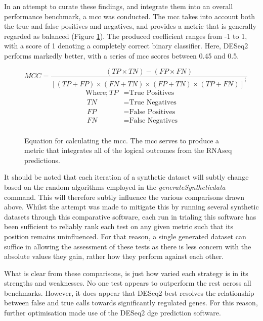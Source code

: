 In an attempt to curate these findings, and integrate them into an overall performance benchmark, a \acrshort{mcc} was conducted. The \acrshort{mcc} takes into account both the true and false positives and negatives, and provides a metric that is generally regarded as balanced (Figure \ref{mcc_calc}). The produced coefficient ranges from -1 to 1, with a score of 1 denoting a completely correct binary classifier. Here, DESeq2 performs markedly better, with a series of \acrshort{mcc} scores between 0.45 and 0.5.

\begin{figure}
\[MCC = \frac{\left ( TP \times TN \right) - \left ( FP \times FN \right )}{\left [ \left ( TP + FP \right ) \times \left ( FN + TN \right ) \times\left ( FP + TN \right ) \times \left ( TP + FN \right )\right ]^{^{\frac{1}{2}}}}\]
\normalsize
\begin{align*}
\text{Where;} ~TP &= \text{True Positives} \\
~TN &= \text{True Negatives} \\
~FP &= \text{False Positives} \\
~FN &= \text{False Negatives} \\
\end{align*}
\caption{Equation for calculating the \acrfull{mcc}. The \acrshort{mcc} serves to produce a metric that integrates all of the logical outcomes from the RNAseq predictions.}
\label{mcc_calc}
\end{figure}

It should be noted that each iteration of a synthetic dataset will subtly change based on the random algorithms employed in the \textit{generateSyntheticdata} command. This will therefore subtly influence the various comparisons drawn above. Whilst the attempt was made to mitigate this by running several synthetic datasets through this comparative software, each run in trialing this software has been sufficient to reliably rank each test on any given metric such that its position remains uninfluenced. For that reason, a single generated dataset can suffice in allowing the assessment of these tests as there is less concern with the absolute values they gain, rather how they perform against each other. 

What is clear from these comparisons, is just how varied each strategy is in its strengths and weaknesses. No one test appears to outperform the rest across all benchmarks. However, it does appear that DESeq2 best resolves the relationship between false and true calls towards significantly regulated genes. For this reason, further optimisation made use of the DESeq2 \acrshort{dge} prediction software. 

